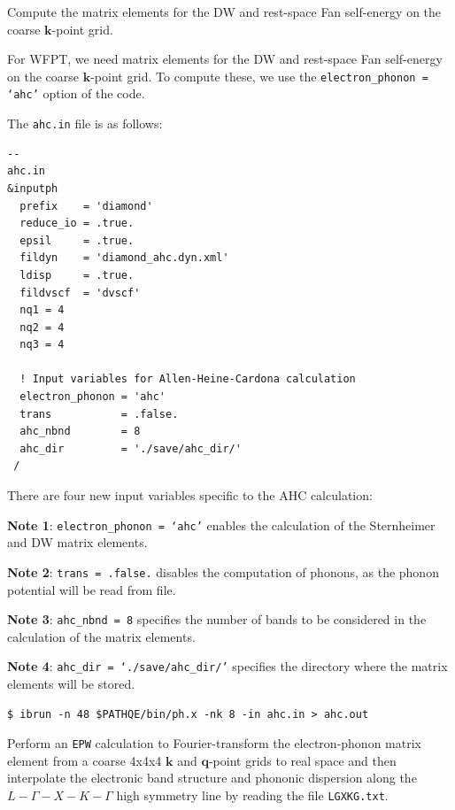 \documentclass[a4paper,11pt,serif]{article}
\newcommand{\mb}[1]{\mathbf{#1}}
\begin{document}
\vspace{0.5cm}
\action Compute the matrix elements for the DW and rest-space Fan self-energy on the coarse $\mb{k}$-point grid.

For WFPT, we need matrix elements for the DW and rest-space Fan self-energy on the coarse $\mb{k}$-point grid.
To compute these, we use the \texttt{electron\_phonon = `ahc'} option of the  code.


The \texttt{ahc.in} file is as follows:
\begin{scriptsize}
 \begin{Verbatim}[frame=single]
--                                                                                                 ahc.in
&inputph
  prefix    = 'diamond'
  reduce_io = .true.
  epsil     = .true.
  fildyn    = 'diamond_ahc.dyn.xml'
  ldisp     = .true.
  fildvscf  = 'dvscf'
  nq1 = 4
  nq2 = 4
  nq3 = 4

  ! Input variables for Allen-Heine-Cardona calculation
  electron_phonon = 'ahc'
  trans           = .false.
  ahc_nbnd        = 8
  ahc_dir         = './save/ahc_dir/'
 /
\end{Verbatim}
\end{scriptsize}
There are four new input variables specific to the AHC calculation:

\begin{footnotesize}
   \textbf{Note 1}: \texttt{electron\_phonon = `ahc'} enables the calculation of the Sternheimer and DW matrix elements.

   \textbf{Note 2}: \texttt{trans = .false.} disables the computation of phonons, as the phonon potential will be read from file.

   \textbf{Note 3}: \texttt{ahc\_nbnd = 8} specifies the number of bands to be considered in the calculation of the matrix elements.

   \textbf{Note 4}: \texttt{ahc\_dir = `./save/ahc\_dir/'} specifies the directory where the matrix elements will be stored.
\end{footnotesize}


\begin{verbatim}
$ ibrun -n 48 $PATHQE/bin/ph.x -nk 8 -in ahc.in > ahc.out
\end{verbatim}


\vspace{0.5cm}
\action Perform an \texttt{EPW} calculation to Fourier-transform the electron-phonon matrix element from a coarse 4x4x4 $\mb{k}$ and $\mb{q}$-point grids to real space and then interpolate the electronic band structure and phononic dispersion along the $L-\Gamma-X-K-\Gamma$ high symmetry line by reading the file \texttt{LGXKG.txt}.
\end{document}
